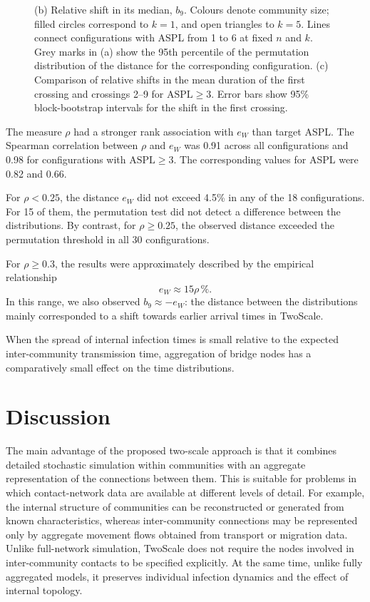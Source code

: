 \documentclass{ieeeaccess}
\newcommand{\TS}{\textup{TwoScale}}
\newcommand{\eW}{e_{W}}
\begin{document}
\begin{figure}[!tbp]
{(b) Relative shift in its median, $b_9$.
Colours denote community size; filled circles correspond to $k=1$, and open triangles to $k=5$.
Lines connect configurations with ASPL from 1 to 6 at fixed $n$ and $k$. Grey marks in (a) show the 95th percentile of the permutation distribution of the distance for the corresponding configuration.
(c) Comparison of relative shifts in the mean duration of the first crossing and crossings 2--9 for $\mathrm{ASPL}\geq3$.
Error bars show 95\% block-bootstrap intervals for the shift in the first crossing.
}
\label{fig:descriptor}
\end{figure}

The measure $\rho$ had a stronger rank association with $\eW$ than target ASPL. The Spearman correlation between $\rho$ and $\eW$ was 0.91 across all configurations and 0.98 for configurations with $\mathrm{ASPL}\geq3$. The corresponding values for ASPL were 0.82 and 0.66.

For $\rho<0.25$, the distance $\eW$ did not exceed 4.5\% in any of the 18 configurations. For 15 of them, the permutation test did not detect a difference between the distributions. By contrast, for $\rho\geq0.25$, the observed distance exceeded the permutation threshold in all 30 configurations.

For $\rho\geq0.3$, the results were approximately described by the empirical relationship
\begin{equation}
\eW \approx 15\rho\,\%.
\end{equation}
In this range, we also observed $b_9\approx-\eW$: the distance between the distributions mainly corresponded to a shift towards earlier arrival times in \TS{}.

When the spread of internal infection times is small relative to the expected inter-community transmission time, aggregation of bridge nodes has a comparatively small effect on the time distributions.

\section{Discussion}
\label{sec:discussion}

The main advantage of the proposed two-scale approach is that it combines detailed stochastic simulation within communities with an aggregate representation of the connections between them. This is suitable for problems in which contact-network data are available at different levels of detail. For example, the internal structure of communities can be reconstructed or generated from known characteristics, whereas inter-community connections may be represented only by aggregate movement flows obtained from transport or migration data. Unlike full-network simulation, \TS{} does not require the nodes involved in inter-community contacts to be specified explicitly. At the same time, unlike fully aggregated models, it preserves individual infection dynamics and the effect of internal topology.
\end{document}
